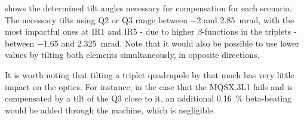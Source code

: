  shows the determined tilt angles necessary for compensation for each scenario.
The necessary tilts using Q\num{2} or Q\num{3} range between \num{-2} and \qty{2.85}{\milli\radian}, with the most impactful ones at IR\num{1} and IR\num{5} - due to higher \(\beta\)-functions in the triplets - between \num{-1.65} and \qty{2.325}{\milli\radian}.
Note that it would also be possible to use lower values by tilting both elements simultaneously, in opposite directions.

It is worth noting that tilting a triplet quadrupole by that much has very little impact on the optics.
For instance, in the case that the MQSX.\num{3}L\num{1} fails and is compensated by a tilt of the Q\num{3} close to it, an additional \qty{0.16}{\percent} \gls{beta-beating} would be added through the machine, which is negligible.
\newline

